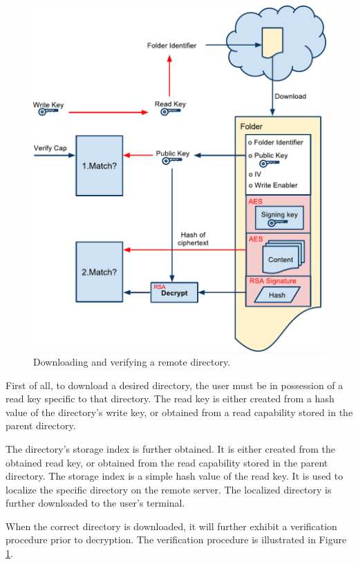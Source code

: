 \documentclass[pdftex,english,10pt,b5paper,twoside]{book}
\begin{document}
\begin{figure}[h!]
    \centering
    \includegraphics[width=\columnwidth]{VerifyOpenFolder.pdf}
    \caption{Downloading and verifying a remote directory.}
    \label{fig:CS:VOD}
\end{figure}

First of all, to download a desired directory, the user must be in
possession of a read key specific to that directory. The read key is either
created from a hash value of the directory's write key, or obtained from a read
capability stored in the parent directory.

The directory's storage index is further obtained. It is either created from the
obtained read key, or obtained from the read capability stored in the parent
directory. The storage index is a simple hash value of the read key. It is used to
localize the specific directory on the remote server. The localized directory is
further downloaded to the user's terminal.

When the correct directory is downloaded, it will further exhibit a verification
procedure prior to decryption. The verification procedure is illustrated in
Figure \ref{fig:CS:VOD}.
\end{document}
